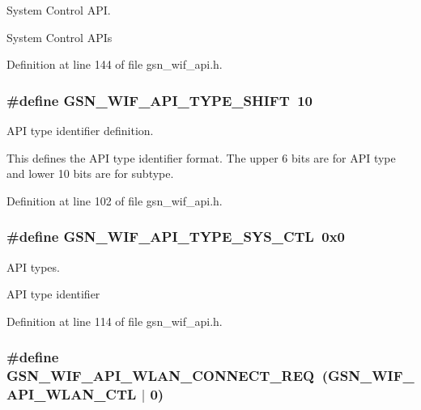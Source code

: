 System Control API. 

System Control APIs 

Definition at line 144 of file gsn\_\-wif\_\-api.h.

\hypertarget{a00636_ga3c3fb4bb2d829ffe7098bdd4ee283a42}{
\subsubsection[{GSN\_\-WIF\_\-API\_\-TYPE\_\-SHIFT}]{\setlength{\rightskip}{0pt plus 5cm}\#define GSN\_\-WIF\_\-API\_\-TYPE\_\-SHIFT~10}}
\label{a00636_ga3c3fb4bb2d829ffe7098bdd4ee283a42}


API type identifier definition. 

This defines the API type identifier format. The upper 6 bits are for API type and lower 10 bits are for subtype. 

Definition at line 102 of file gsn\_\-wif\_\-api.h.

\hypertarget{a00636_ga1bd275f0a8f47dba99b6e22adcb67ca4}{
\subsubsection[{GSN\_\-WIF\_\-API\_\-TYPE\_\-SYS\_\-CTL}]{\setlength{\rightskip}{0pt plus 5cm}\#define GSN\_\-WIF\_\-API\_\-TYPE\_\-SYS\_\-CTL~0x0}}
\label{a00636_ga1bd275f0a8f47dba99b6e22adcb67ca4}


API types. 

API type identifier 

Definition at line 114 of file gsn\_\-wif\_\-api.h.

\hypertarget{a00636_ga807417e493752092e13b44e6f31b896e}{
\subsubsection[{GSN\_\-WIF\_\-API\_\-WLAN\_\-CONNECT\_\-REQ}]{\setlength{\rightskip}{0pt plus 5cm}\#define GSN\_\-WIF\_\-API\_\-WLAN\_\-CONNECT\_\-REQ~(GSN\_\-WIF\_\-API\_\-WLAN\_\-CTL $|$ 0)}}
\label{a00636_ga807417e493752092e13b44e6f31b896e}


